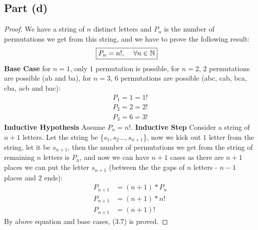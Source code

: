 \documentclass{article}
\begin{document}
{  \subsection{Part (d)}{
    \begin{proof}
    We have a string of $n$ distinct letters and $P_n$ is the number of permutations we get from this string, and we have to prove the following result:
    \begin{align}
      \Aboxed{P_n=n!,\, \quad \forall n \in \mathbb{N}} \label{eq:7}
    \end{align}
    \textbf{Base Case} for $n=1$, only $1$ permutation is possible, for $n=2$, $2$ permutations are possible (ab and ba), for $n=3$, $6$ permutations are possible (abc, cab, bca, cba, acb and bac):
    \begin{align*}
      P_1=1=1! \\
      P_2=2=2! \\
      P_3=6=3!
    \end{align*}
    \textbf{Inductive Hypothesis} Assume $P_n=n!$. \newline
    \textbf{Inductive Step}  Consider a string of $n+1$ letters. \newline
    Let the string be \{$s_1,s_2\dots,s_{n+1}$\}, now we kick out $1$ letter from the string, let it be $s_{n+1}$, then the number of permutations we get from the string of remaining $n$ letters is $P_n$, and now we can have $n+1$ cases as there are $n+1$ places we can put the letter $s_{n+1}$ (between the the gaps of $n$ letters - $n-1$ places and $2$ ends):
    \begin{align*}
      P_{n+1}&=(n+1)*P_n \\
      P_{n+1}&=(n+1)*n! \\
      P_{n+1}&=(n+1)!
    \end{align*}
    By above equation and base cases, (3.7) is proved.
    \end{proof}
  }
}
\end{document}
